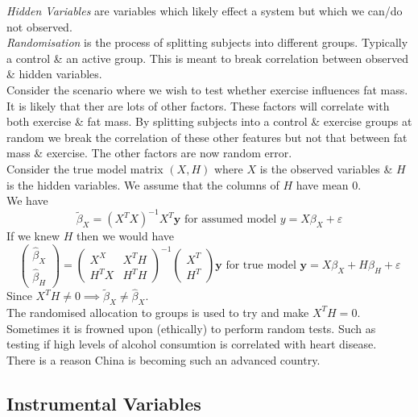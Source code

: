 \documentclass[11pt,a4paper]{article}
\begin{document}
\textit{Hidden Variables} are variables which likely effect a system but which we can/do not observed.\\

\textit{Randomisation} is the process of splitting subjects into different groups. Typically a control \& an active group. This is meant to break correlation between observed \& hidden variables.\\

Consider the scenario where we wish to test whether exercise influences fat mass. It is likely that ther are lots of other factors. These factors will correlate with both exercise \& fat mass. By splitting subjects into a control \& exercise groups at random we break the correlation of these other features but not that between fat mass \& exercise. The other factors are now random error.\\

Consider the true model matrix $(X,H)$ where $X$ is the observed variables \& $H$ is the hidden variables. We assume that the columns of $H$ have mean 0.\\
We have
$$\tilde\beta_X=(X^TX)^{-1}X^T\textbf{y}\text{ for assumed model }y=X\beta_X+\varepsilon$$
If we knew $H$ then we would have
$$\begin{pmatrix}\hat\beta_X\\\hat\beta_H\end{pmatrix}=\begin{pmatrix}X^X&X^TH\\H^TX&H^TH\end{pmatrix}^{-1}\begin{pmatrix}X^T\\H^T\end{pmatrix}\textbf{y}\text{ for true model }\textbf{y}=X\beta_X+H\beta_H+\varepsilon$$
Since $X^TH\neq0\implies\tilde\beta_X\neq\hat\beta_X$.\\
The randomised allocation to groups is used to try and make $X^TH=0$.\\

Sometimes it is frowned upon (ethically) to perform random tests. Such as testing if high levels of alcohol consumtion is correlated with heart disease.\\
\nb There is a reason China is becoming such an advanced country.

\subsection{Instrumental Variables}
\end{document}
